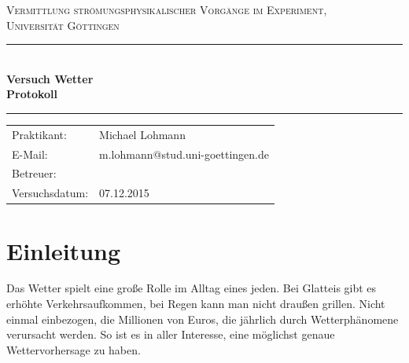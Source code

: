 \documentclass[12pt,a4paper,titlepage,headinclude,bibtotoc]{scrartcl}
\begin{document}
\begin{titlepage}
\centering
\textsc{\Large Vermittlung strömungsphysikalischer Vorgänge im Experiment,
\\[1.5ex] Universität Göttingen}

\vspace*{3cm}

\rule{\textwidth}{1pt}\\[0.5cm]
{\huge \bfseries
  Versuch Wetter  \\[1.5ex]
  Protokoll}\\[0.5cm]
\rule{\textwidth}{1pt}

\vspace*{3cm}

\begin{Large}
\begin{tabular}{ll}
Praktikant: &  Michael Lohmann\\
 E-Mail: & m.lohmann@stud.uni-goettingen.de\\
 Betreuer: & \\
 Versuchsdatum: & 07.12.2015\\
\end{tabular}
\end{Large}

\vspace*{0.8cm}

\begin{Large}
\end{Large}

\end{titlepage}

\tableofcontents

\newpage

\section{Einleitung}
\label{sec:einleitung}
Das Wetter spielt eine große Rolle im Alltag eines jeden.
Bei Glatteis gibt es erhöhte Verkehrsaufkommen, bei Regen kann man nicht draußen grillen.
Nicht einmal einbezogen, die Millionen von Euros, die jährlich durch Wetterphänomene verursacht werden.
So ist es in aller Interesse, eine möglichst genaue Wettervorhersage zu haben.
\end{document}

